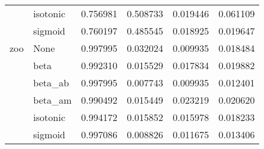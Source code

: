 \begin{tabular}{llrrrr}
        & isotonic &  0.756981 &  0.508733 &  0.019446 &  0.061109 \\
        & sigmoid &  0.760197 &  0.485545 &  0.018925 &  0.019647 \\
zoo & None &  0.997995 &  0.032024 &  0.009935 &  0.018484 \\
        & beta &  0.992310 &  0.015529 &  0.017834 &  0.019882 \\
        & beta\_ab &  0.997995 &  0.007743 &  0.009935 &  0.012401 \\
        & beta\_am &  0.990492 &  0.015449 &  0.023219 &  0.020620 \\
        & isotonic &  0.994172 &  0.015852 &  0.015978 &  0.018233 \\
        & sigmoid &  0.997086 &  0.008826 &  0.011675 &  0.013406 \\
\bottomrule
\end{tabular}
